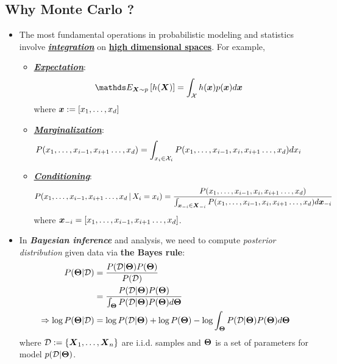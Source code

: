 \documentclass[11pt]{article}
\begin{document}
\subsection{Why Monte Carlo ?}
\begin{itemize}
\item The most fundamental operations in probabilistic modeling and statistics involve \underline{\emph{\textbf{integration}}} on \underline{\textbf{high dimensional spaces}}. For example, 
\begin{itemize}
\item \underline{\emph{\textbf{Expectation}}}: 
\begin{align}
\E{\mb{X}\sim p}{h(\mb{X})} &= \int_{\cX}h(\mb{x})p(\mb{x}) d\mb{x}  \label{eqn: exp_integration}
\end{align} where $\boldsymbol{x}:= [x_1,\ldots, x_d]$

\item \underline{\emph{\textbf{Marginalization}}}:
\begin{align*}
P(x_1,\ldots, x_{i-1}, x_{i+1} \ldots, x_d) &= \int_{x_i \in {\mathcal X}_i}P(x_1,\ldots, x_{i-1}, x_i, x_{i+1} \ldots, x_d) d x_i
\end{align*}

\item \underline{\emph{\textbf{Conditioning}}}:
\begin{align*}
P(x_1,\ldots, x_{i-1}, x_{i+1} \ldots, x_d \,|\, X_i = x_i) 
&= \frac{P(x_1,\ldots, x_{i-1}, x_i, x_{i+1} \ldots, x_d)}{ \int_{\boldsymbol{x}_{-i} \in \boldsymbol{X}_{-i}}P(x_1,\ldots, x_{i-1}, x_i, x_{i+1} \ldots, x_d) d\boldsymbol{x}_{-i}}
\end{align*} where $\boldsymbol{x}_{-i} = [x_1,\ldots, x_{i-1}, x_{i+1} \ldots, x_d]$.
\end{itemize}

\item In \emph{\textbf{Bayesian inference}} and analysis, we need to compute \emph{posterior distribution} given data via \textbf{the Bayes rule}: 
\begin{align*}
P(\boldsymbol{\Theta} | {\mathcal D}) &= \frac{P({\mathcal D} | \boldsymbol{\Theta}) P(\boldsymbol{\Theta})}{P({\mathcal D})}\\
 &= \frac{P({\mathcal D} | \boldsymbol{\Theta}) P(\boldsymbol{\Theta})}{\int_{\boldsymbol{\Theta}} P({\mathcal D} | \boldsymbol{\Theta}) P(\boldsymbol{\Theta}) d \boldsymbol{\Theta}}\\
 \Rightarrow \log P(\boldsymbol{\Theta} | {\mathcal D})  &= \log P({\mathcal D} | \boldsymbol{\Theta}) + \log P(\boldsymbol{\Theta}) - \log \int_{\boldsymbol{\Theta}} P({\mathcal D} | \boldsymbol{\Theta}) P(\boldsymbol{\Theta}) d \boldsymbol{\Theta}
\end{align*} where ${\mathcal D}: =\left\{\boldsymbol{X}_1, \ldots, \boldsymbol{X}_n\right\}$ are i.i.d. samples and $\boldsymbol{\Theta}$ is a set of parameters for model $p({\mathcal D} | \boldsymbol{\Theta})$.


\end{itemize}
\end{document}
